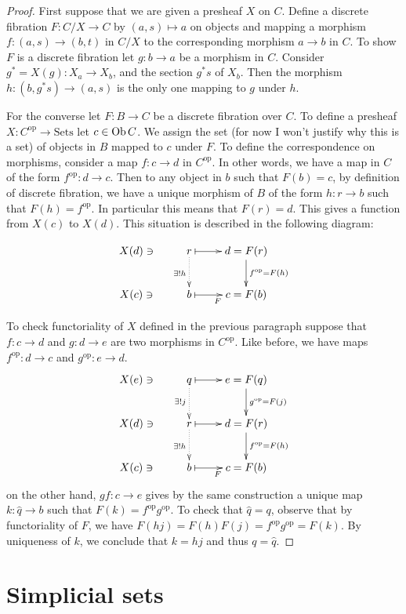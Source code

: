 \begin{proof}
First suppose that we are given a presheaf $X$ on $C$. Define a discrete
fibration $F:C/X \to C$ by $(a,s)\mapsto a$ on objects and
mapping a morphism $f:(a,s)\to (b,t)$ in $C/X$ to the
corresponding morphism $a \to b$ in $C$.
To show $F$ is a discrete fibration 
let $g:b\to a$ be a morphism in $C$. 
Consider $g^*=X(g):X_a\to X_b$,
and the section $g^*s$ of $X_b$.
Then the
morphism $h:(b,g^*s)\to (a,s)$ is the only one mapping to $g$ under $h$.

For the converse let $F:B \to C$ be a discrete fibration over $C$.
To define a presheaf $X:C^{\text{op}}\to \text{Sets}$ let $c \in \mathop{\mathrm{Ob}}\nolimits C$.
We assign the set (for now I won't justify why this is a set)
of objects in $B$ mapped to $c$ under $F$.
To define the correspondence on morphisms, 
consider a map $f:c \to d$ in $C^{\text{op}}$.
In other words, we have a map in  $C$ of the form $f^{\text{op}}:d \to c$.
Then to any object in $b$ such that $F(b)=c$,
by definition of discrete fibration,
we have a unique morphism of $B$ of the form
$h:r \to b$ such that $F(h)=f^{\text{op}}$.
In particular this means that $F(r)=d$.
This gives a function from $X(c)$ to $X(d)$.
This situation is described in the following diagram:

$$
\xymatrix{
X(d)\ni&r \ar@{.>}[d]_{\exists!h}\ar@{|->}[r]& d=F(r)
\ar[d]^{f^{\text{op}}=F(h)}\\
X(c)\ni& b\ar@{|->}[r]_F&c=F(b)
}
$$




To check functoriality of $X$ defined in the previous paragraph
suppose that $f:c\to d$ and $g:d\to e$ are two morphisms in $C^{\text{op}}$.
Like before, we have maps $f^{\text{op}}:d\to c$ and $g^{\text{op}}:e \to d$.
$$
\xymatrix{
X(e)\ni& q\ar@{.>}[d]_{\exists !j}\ar@{|->}[r]& e=F(q)
\ar[d]^{g^{\text{op}}=F(j)}\\
X(d)\ni&r \ar@{.>}[d]_{\exists!h}\ar@{|->}[r]& d=F(r)
\ar[d]^{f^{\text{op}}=F(h)}\\
X(c)\ni& b\ar@{|->}[r]_F&c=F(b)
}
$$
on the other hand, $gf:c \to e$ gives by the
same construction a unique map $k:\hat{q}  \to b$
such that $F(k)=f^{\text{op}}g^{\text{op}}$.
To check that $\hat{q}=q$, observe that
by functoriality of $F$, we have
$F(hj)=F(h)F(j)=f^{\text{op}}g^{\text{op}}=F(k)$.
By uniqueness of $k$, we conclude that
$k=hj$ and thus $q=\hat{q}$.
\end{proof}





\section{Simplicial sets}
\label{section-simplicial-sets}

